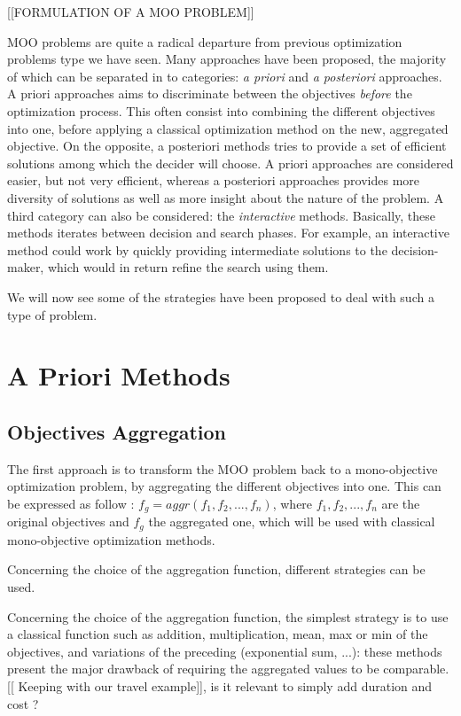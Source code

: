 [[FORMULATION OF A MOO PROBLEM]]

MOO problems are quite a radical departure from previous optimization problems type we have seen. Many approaches have been proposed, the majority of which can be separated in to categories: \emph{a priori} and \emph{a posteriori} approaches. A priori approaches aims to discriminate between the objectives \emph{before} the optimization process. This often consist into combining the different objectives into one, before applying a classical optimization method on the new, aggregated objective.
On the opposite, a posteriori methods tries to provide a set of efficient solutions among which the decider will choose.
A priori approaches are considered easier, but not very efficient, whereas a posteriori approaches provides more diversity of solutions as well as more insight about the nature of the problem.
A third category can also be considered: the \emph{interactive} methods. Basically, these methods iterates between decision and search phases. For example, an interactive  method could work by quickly providing intermediate solutions to the decision-maker, which would in return refine the search using them.

We will now see some of the strategies have been proposed to deal with such a type of problem.

\section{A Priori Methods}

\subsection{Objectives Aggregation}

The first approach is to transform the MOO problem back to a mono-objective optimization problem, by aggregating the different objectives into one. This can be expressed as follow : \(f_g = aggr(f_1, f_2, ..., f_n)\), where \(f_1, f_2, ..., f_n\) are the original objectives and \(f_g\) the aggregated one, which will be used with classical mono-objective optimization methods.

Concerning the choice of the aggregation function, different strategies can be used.

Concerning the choice of the aggregation function, the simplest strategy is to use a classical function such as addition, multiplication, mean, max or min of the objectives, and variations of the preceding (exponential sum, ...): these methods present the major drawback of requiring the aggregated values to be comparable.[[ Keeping with our travel example]], is it relevant to simply add duration and cost ?


